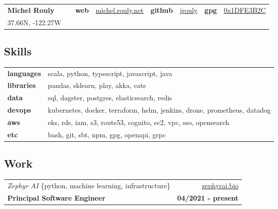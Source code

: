 \documentclass[10pt,letterpaper]{article}
\begin{document}
\setcounter{secnumdepth}{0}

\noindent
\begin{tabularx}{\textwidth}{@{} lXllllll @{}}
  {\Large\textbf{Michel Rouly}}
  &
  & \textbf{web}
  & \href{https://michel.rouly.net}{michel.rouly.net}
  & \textbf{github}
  & \href{https://github.com/jrouly}{jrouly}
  & \textbf{gpg}
  & \href{https://keyserver.ubuntu.com/pks/lookup?search=0x1DFE3B2C\&fingerprint=on\&op=index}{0x1DFE3B2C} \\

  {37.66N, -122.27W}
  &
  &
  &
  &
  &
  &
  &
\end{tabularx}

\subsection{Skills}

\noindent
\begin{tabularx}{\textwidth}{@{} lX @{}}
  \textbf{languages} & scala, python, typescript, javascript, java \\
  \textbf{libraries} & pandas, sklearn, play, akka, cats \\
  \textbf{data} & sql, dagster, postgres, elasticsearch, redis \\
  \textbf{devops} & kubernetes, docker, terraform, helm, jenkins, drone, prometheus, datadog \\
  \textbf{aws} & eks, rds, iam, s3, route53, cognito, ec2, vpc, sso, opensearch \\
  \textbf{etc} & bash, git, sbt, npm, gpg, openapi, grpc
\end{tabularx}

\subsection{Work}

\noindent\begin{tabularx}{\textwidth}{@{} Xr @{}}
  \textit{Zephyr AI} \{python, machine learning, infrastructure\} & \href{https://zephyrai.bio}{zephyrai.bio} \\
  \textbf{Principal Software Engineer} & \textbf{04/2021 - present} \\
\end{tabularx}
\end{document}
